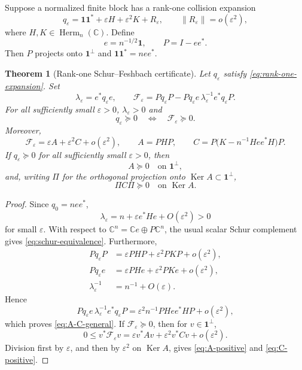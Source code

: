 \documentclass[11pt]{article}
\newtheorem{theorem}{Theorem}[section]
\newcommand{\one}{\mathbf 1}
\newcommand{\C}{\mathbb C}
\newcommand{\eps}{\varepsilon}
\newcommand{\norm}[1]{\lVert #1\rVert}
\newcommand{\Ker}{\operatorname{Ker}}
\newcommand{\Herm}{\operatorname{Herm}}
\begin{document}
Suppose a normalized finite block has a rank-one collision expansion
\begin{equation}
  q_\eps=\one\one^*+\eps H+\eps^2K+R_\eps,
  \qquad
  \norm{R_\eps}=o(\eps^2),
  \label{eq:rank-one-expansion}
\end{equation}
where $H,K\in\Herm_n(\C)$.  Define
\begin{equation}
  e=n^{-1/2}\one,
  \qquad
  P=I-ee^*.
  \label{eq:e-P}
\end{equation}
Then $P$ projects onto $\one^\perp$ and $\one\one^*=nee^*$.

\begin{theorem}[Rank-one Schur--Feshbach certificate]
\label{thm:schur-feshbach}
Let $q_\eps$ satisfy \eqref{eq:rank-one-expansion}.  Set
\begin{equation}
  \lambda_\eps=e^*q_\eps e,
  \qquad
  \mathcal F_\eps
  =Pq_\eps P-Pq_\eps e\,\lambda_\eps^{-1}e^*q_\eps P.
  \label{eq:feshbach-map}
\end{equation}
For all sufficiently small $\eps>0$, $\lambda_\eps>0$ and
\begin{equation}
  q_\eps\succeq0
  \quad\Longleftrightarrow\quad
  \mathcal F_\eps\succeq0.
  \label{eq:schur-equivalence}
\end{equation}
Moreover,
\begin{equation}
  \mathcal F_\eps
  =\eps A+\eps^2C+o(\eps^2),
  \qquad
  A=PHP,
  \qquad
  C=P\bigl(K-n^{-1}Hee^*H\bigr)P.
  \label{eq:A-C-general}
\end{equation}
If $q_\eps\succeq0$ for all sufficiently small $\eps>0$, then
\begin{equation}
  A\succeq0\quad\text{on }\one^\perp,
  \label{eq:A-positive}
\end{equation}
and, writing $\Pi$ for the orthogonal projection onto $\Ker A\subset\one^\perp$,
\begin{equation}
  \Pi C\Pi\succeq0\quad\text{on }\Ker A.
  \label{eq:C-positive}
\end{equation}
\end{theorem}

\begin{proof}
Since $q_0=nee^*$,
\[
  \lambda_\eps=n+\eps e^*He+O(\eps^2)>0
\]
for small $\eps$.  With respect to $\C^n=\C e\oplus P\C^n$, the usual scalar Schur complement gives \eqref{eq:schur-equivalence}.  Furthermore,
\begin{align*}
  Pq_\eps P&=\eps PHP+\eps^2PKP+o(\eps^2),\\
  Pq_\eps e&=\eps PHe+\eps^2PKe+o(\eps^2),\\
  \lambda_\eps^{-1}&=n^{-1}+O(\eps).
\end{align*}
Hence
\[
  Pq_\eps e\,\lambda_\eps^{-1}e^*q_\eps P
  =\eps^2n^{-1}PHee^*HP+o(\eps^2),
\]
which proves \eqref{eq:A-C-general}.  If $\mathcal F_\eps\succeq0$, then for $v\in\one^\perp$,
\[
  0\le v^*\mathcal F_\eps v
  =\eps v^*Av+\eps^2v^*Cv+o(\eps^2).
\]
Division first by $\eps$, and then by $\eps^2$ on $\Ker A$, gives \eqref{eq:A-positive} and \eqref{eq:C-positive}.
\end{proof}
\end{document}
